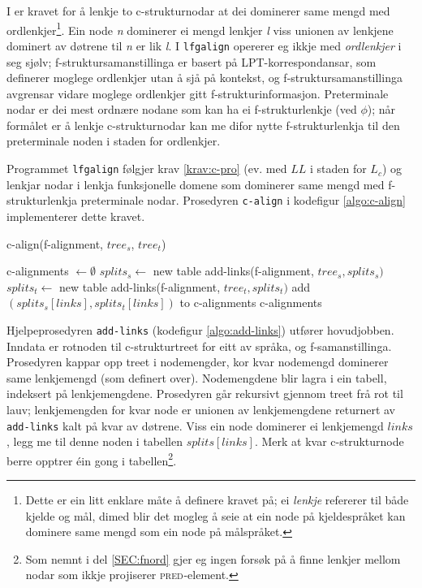 \documentclass[12pt,a4paper,oneside,draft]{report}
\newcommand{\F}[2]{\textsc{#1}\ensuremath{_{#2}}}
\newcommand{\PRED}{\F{pred}{}}
\begin{document}
I \citet[s.~77]{dyvik2009lmp} er kravet for å lenkje to
 c\hyp{}strukturnodar at dei dominerer same mengd med
 ordlenkjer\footnote{Dette er ein litt enklare måte å definere kravet på; ei
        \emph{lenkje} refererer til både kjelde og mål, dimed blir det
        mogleg å seie at ein node på kjeldespråket kan dominere same
        mengd som ein node på målspråket. }. Ein node \emph{n} dominerer ei mengd lenkjer \emph{l} viss
 unionen av lenkjene dominert av døtrene til \emph{n} er lik \emph{l}. I
 \texttt{lfgalign} opererer eg ikkje med \emph{ordlenkjer} i seg sjølv;
 f\hyp{}struktursamanstillinga er basert på LPT\hyp{}korrespondansar,
 som definerer moglege ordlenkjer utan å sjå på kontekst, og
 f\hyp{}struktursamanstillinga avgrensar vidare moglege ordlenkjer
 gitt f\hyp{}strukturinformasjon. Preterminale nodar er dei mest
 ordnære nodane som kan ha ei f\hyp{}strukturlenkje (ved $\phi$); når
 formålet er å lenkje c\hyp{}strukturnodar kan me difor nytte
 f\hyp{}strukturlenkja til den preterminale noden i staden for
 ordlenkjer.

Programmet \texttt{lfgalign} følgjer krav \ref{krav:c-pro} (ev. med $LL$ i
 staden for $L_c$) og lenkjar nodar i lenkja funksjonelle domene som
 dominerer same mengd med f\hyp{}strukturlenkja preterminale
 nodar. Prosedyren \texttt{c-align} i kodefigur \ref{algo:c-align}
 implementerer dette kravet.

 \begin{algorithm}[htbp]
   \caption{c-align(f-alignment, $tree_s$, $tree_t$)}
   \label{algo:c-align}
    
   c-alignments $\gets \emptyset$ \;
   $splits_s \gets$ new table \;
   add-links(f-alignment, $tree_s, splits_s)$  \;
   $splits_t \gets$ new table \;
   add-links(f-alignment, $tree_t, splits_t)$  \;
    {
        {
             add $(splits_s[links],splits_t[links])$ to c-alignments \;
        }
    }
    \Return c-alignments \;
    \end{algorithm}    

Hjelpeprosedyren \texttt{add-links} (kodefigur \ref{algo:add-links}) utfører
 hovudjobben. Inndata er rotnoden til c\hyp{}strukturtreet for eitt av
 språka, og f-samanstillinga. Prosedyren kappar opp treet i
 nodemengder, kor kvar nodemengd dominerer same lenkjemengd (som
 definert over).  Nodemengdene blir lagra i ein tabell, indeksert på
 lenkjemengdene. Prosedyren går rekursivt gjennom treet frå rot til
 lauv; lenkjemengden for kvar node er unionen av lenkjemengdene
 returnert av \texttt{add-links} kalt på kvar av døtrene. Viss ein node
 dominerer ei lenkjemengd $links$, legg me til denne noden i tabellen
 $splits[links]$. Merk at kvar c\hyp{}strukturnode berre opptrer éin gong i
 tabellen\footnote{Som nemnt i del \ref{SEC:fnord} gjer eg ingen forsøk på å
        finne lenkjer mellom nodar som ikkje projiserer
        \PRED{}-element. }.
\end{document}
